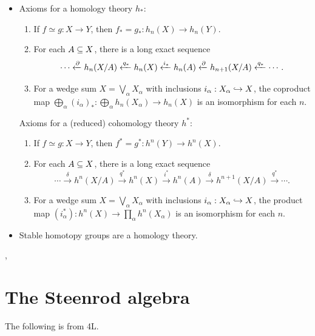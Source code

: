 \documentclass{MetricNotes2023}
\def\subq{\ensuremath\subseteq}
\def\inj{\ensuremath\hookrightarrow}
\def\del{\ensuremath\partial}
\begin{document}
\begin{itemize}
\item Axioms for a homology theory \(h_*\):
\begin{enumerate}
\item If \(f\simeq g : X \to Y\), then \(f_*=g_* : h_n(X)\to h_n(Y)\).
\item For each \(A\subq X\), there is a long exact sequence
\[\cdots \xleftarrow{\del}h_n(X/A)\xleftarrow{q_*}h_n(X) \xleftarrow{i_*}h_n(A) \xleftarrow{\del} h_{n+1}(X/A)\xleftarrow{q_*}\cdots.\]
\item For a wedge sum \(X=\bigvee_\alpha X_\alpha\) with inclusions \(i_\alpha : X_\alpha \inj X\), the coproduct map \(\bigoplus_\alpha (i_\alpha)_* : \bigoplus_\alpha h_n(X_\alpha) \to  h_n(X)\) is an isomorphism for each \(n\). 
\end{enumerate}
Axioms for a (reduced) cohomology theory \(h^*\):
\begin{enumerate}
\item If \(f\simeq g : X \to Y\), then \(f^*=g^* : h^n(Y)\to h^n(X)\).
\item For each \(A\subq X\), there is a long exact sequence
\[\cdots \xrightarrow{\delta}h^n(X/A)\xrightarrow{q^*}h^n(X) \xrightarrow{i^*}h^n(A) \xrightarrow{\delta} h^{n+1}(X/A)\xrightarrow{q^*}\cdots.\]
\item For a wedge sum \(X=\bigvee_\alpha X_\alpha\) with inclusions \(i_\alpha : X_\alpha \inj X\), the product map \((i^*_\alpha) : h^n(X) \to \prod_\alpha h^n(X_\alpha)\) is an isomorphism for each \(n\).
\end{enumerate}
\item Stable homotopy groups are a homology theory.
\end{itemize}

\autocite{ass}, \autocite{hatcher}

\section{The Steenrod algebra}\label{2503221247}

The following is from \autocite{hatcher} 4L.
\end{document}
